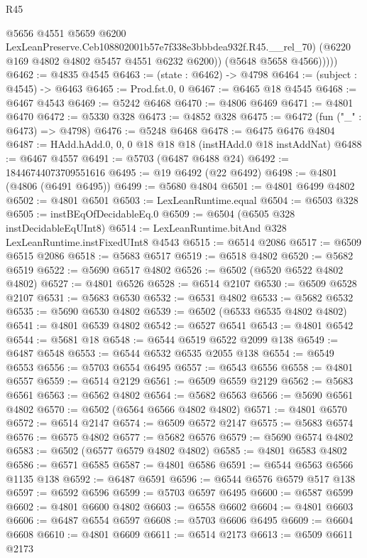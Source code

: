 \begin{lexlean}{R45}
\begin{coremodule}
                @5656
                @4551
                @5659
                @6200
                LexLeanPreserve.Ceb108802001b57e7f338e3bbbdea932f.R45.__rel_70)
              (@6220 @169 @4802 @4802 @5457 @4551 @6232 @6200))
            (@5648 @5658 @4566)))))
@6462 := @4835 @4545
@6463 := (state : @6462) -> @4798
@6464 := (subject : @4545) -> @6463
@6465 := Prod.fst.{0, 0}
@6467 := @6465 @18 @4545
@6468 := @6467 @4543
@6469 := @5242 @6468
@6470 := @4806 @6469
@6471 := @4801 @6470
@6472 := @5330 @328
@6473 := @4852 @328
@6475 := @6472 (fun ("_" : @6473) => @4798)
@6476 := @5248 @6468
@6478 := @6475 @6476 @4804
@6487 := HAdd.hAdd.{0, 0, 0} @18 @18 @18 (instHAdd.{0} @18 instAddNat)
@6488 := @6467 @4557
@6491 := @5703 (@6487 @6488 @24)
@6492 := 18446744073709551616
@6495 := @19 @6492 (@22 @6492)
@6498 := @4801 (@4806 (@6491 @6495))
@6499 := @5680 @4804
@6501 := @4801 @6499 @4802
@6502 := @4801 @6501
@6503 := LexLeanRuntime.equal
@6504 := @6503 @328
@6505 := instBEqOfDecidableEq.{0}
@6509 := @6504 (@6505 @328 instDecidableEqUInt8)
@6514 := LexLeanRuntime.bitAnd @328 LexLeanRuntime.instFixedUInt8 @4543
@6515 := @6514 @2086
@6517 := @6509 @6515 @2086
@6518 := @5683 @6517
@6519 := @6518 @4802
@6520 := @5682 @6519
@6522 := @5690 @6517 @4802
@6526 := @6502 (@6520 @6522 @4802 @4802)
@6527 := @4801 @6526
@6528 := @6514 @2107
@6530 := @6509 @6528 @2107
@6531 := @5683 @6530
@6532 := @6531 @4802
@6533 := @5682 @6532
@6535 := @5690 @6530 @4802
@6539 := @6502 (@6533 @6535 @4802 @4802)
@6541 := @4801 @6539 @4802
@6542 := @6527 @6541
@6543 := @4801 @6542
@6544 := @5681 @18
@6548 := @6544 @6519 @6522 @2099 @138
@6549 := @6487 @6548
@6553 := @6544 @6532 @6535 @2055 @138
@6554 := @6549 @6553
@6556 := @5703 @6554 @6495
@6557 := @6543 @6556
@6558 := @4801 @6557
@6559 := @6514 @2129
@6561 := @6509 @6559 @2129
@6562 := @5683 @6561
@6563 := @6562 @4802
@6564 := @5682 @6563
@6566 := @5690 @6561 @4802
@6570 := @6502 (@6564 @6566 @4802 @4802)
@6571 := @4801 @6570
@6572 := @6514 @2147
@6574 := @6509 @6572 @2147
@6575 := @5683 @6574
@6576 := @6575 @4802
@6577 := @5682 @6576
@6579 := @5690 @6574 @4802
@6583 := @6502 (@6577 @6579 @4802 @4802)
@6585 := @4801 @6583 @4802
@6586 := @6571 @6585
@6587 := @4801 @6586
@6591 := @6544 @6563 @6566 @1135 @138
@6592 := @6487 @6591
@6596 := @6544 @6576 @6579 @517 @138
@6597 := @6592 @6596
@6599 := @5703 @6597 @6495
@6600 := @6587 @6599
@6602 := @4801 @6600 @4802
@6603 := @6558 @6602
@6604 := @4801 @6603
@6606 := @6487 @6554 @6597
@6608 := @5703 @6606 @6495
@6609 := @6604 @6608
@6610 := @4801 @6609
@6611 := @6514 @2173
@6613 := @6509 @6611 @2173

\end{coremodule}
\end{lexlean}

